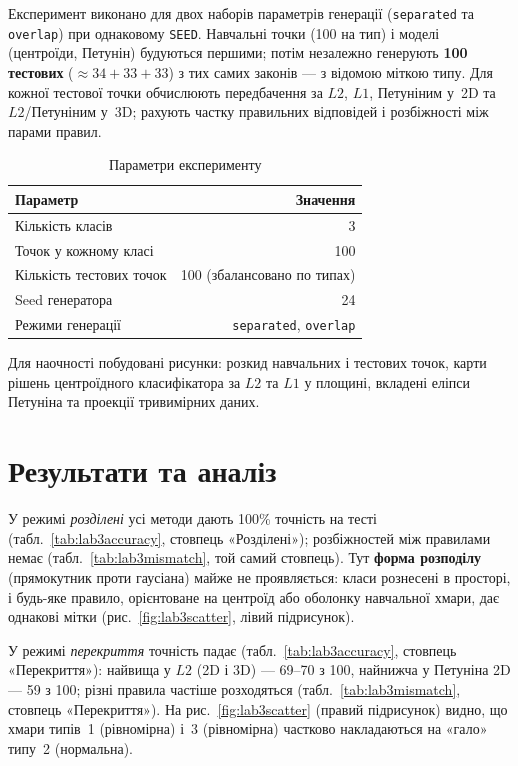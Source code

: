 \documentclass[14pt,a4paper,oneside]{extarticle}
\begin{document}
Експеримент виконано для двох наборів параметрів генерації (\texttt{separated} та \texttt{overlap}) при однаковому \texttt{SEED}. Навчальні точки (100 на тип) і моделі (центроїди, Петунін) будуються першими; потім незалежно генерують \textbf{100 тестових} ($\approx 34{+}33{+}33$) з тих самих законів --- з відомою міткою типу. Для кожної тестової точки обчислюють передбачення за $L2$, $L1$, Петуніним у~2D та $L2$/Петуніним у~3D; рахують частку правильних відповідей і розбіжності між парами правил.

\begin{table}[H]
\centering
\renewcommand{\arraystretch}{1.15}
\begin{tabular}{|l|r|}
\hline
\textbf{Параметр} & \textbf{Значення} \\
\hline
Кількість класів & 3 \\
\hline
Точок у кожному класі & 100 \\
\hline
Кількість тестових точок & 100 (збалансовано по типах) \\
\hline
Seed генератора & 24 \\
\hline
Режими генерації & \texttt{separated}, \texttt{overlap} \\
\hline
\end{tabular}
\caption{Параметри експерименту}
\label{tab:lab3params}
\end{table}

Для наочності побудовані рисунки: розкид навчальних і тестових точок, карти рішень центроїдного класифікатора за $L2$ та $L1$ у площині, вкладені еліпси Петуніна та проекції тривимірних даних.

\section{Результати та аналіз}
\label{sec:results}



У режимі \emph{розділені} усі методи дають 100\% точність на тесті (табл.~\ref{tab:lab3accuracy}, стовпець «Розділені»); розбіжностей між правилами немає (табл.~\ref{tab:lab3mismatch}, той самий стовпець). Тут \textbf{форма розподілу} (прямокутник проти гаусіана) майже не проявляється: класи рознесені в просторі, і будь-яке правило, орієнтоване на центроїд або оболонку навчальної хмари, дає однакові мітки (рис.~\ref{fig:lab3scatter}, лівий підрисунок).

У режимі \emph{перекриття} точність падає (табл.~\ref{tab:lab3accuracy}, стовпець «Перекриття»): найвища у $L2$ (2D і 3D) --- 69--70 з 100, найнижча у Петуніна 2D --- 59 з 100; різні правила частіше розходяться (табл.~\ref{tab:lab3mismatch}, стовпець «Перекриття»). На рис.~\ref{fig:lab3scatter} (правий підрисунок) видно, що хмари типів~1 (рівномірна) і~3 (рівномірна) частково накладаються на «гало» типу~2 (нормальна).
\end{document}
